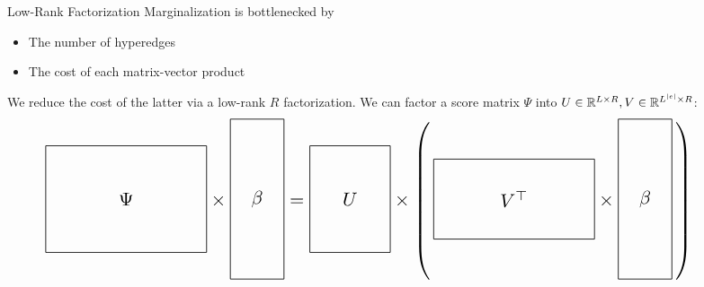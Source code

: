 \documentclass{beamer}
\newlength{\onecolwid}
\begin{document}
\begin{frame}
\begin{columns}[t]
\begin{column}{\onecolwid}
\begin{block}{Low-Rank Factorization}
Marginalization is bottlenecked by
\begin{itemize}
\item The number of hyperedges
\item The cost of each matrix-vector product
\end{itemize}
We reduce the cost of the latter via a low-rank $R$ factorization.
We can factor a score matrix $\Psi$ into 
$U\in\mathbb{R}^{L \times R},V\in\mathbb{R}^{L^{|e|}\times R}$:
\[
\scalebox{1.5}{
$
\vcenter{\hbox{\begin{tikzpicture}[baseline=-0.5ex]
    \draw (0,0) rectangle (3,2) node[pos=.5] {$\Psi$};
\end{tikzpicture}}}
\times
\vcenter{\hbox{\begin{tikzpicture}[baseline=-0.5ex]
    \draw (0,0) rectangle (1,3) node[pos=.5] {$\beta$};
\end{tikzpicture}}}
=
\vcenter{\hbox{\begin{tikzpicture}[baseline=-0.5ex]
    \draw (0,0) rectangle (1.5,2) node[pos=.5] {$U$};
\end{tikzpicture}}}
\times
\left(\,
\vcenter{\hbox{\begin{tikzpicture}[baseline=-0.5ex]
    \draw (0,0) rectangle (3,1.5) node[pos=.5] {$V^\top$};
\end{tikzpicture}}}
\times
\vcenter{\hbox{\begin{tikzpicture}[baseline=-0.5ex]
    \draw (0,0) rectangle (1,3) node[pos=.5] {$\beta$};
\end{tikzpicture}}}
\,\right)
$
}
\]

\end{block}


\end{column} %

\begin{column}{\onecolwid} %



\end{column}
\end{columns}
\end{frame}
\end{document}

